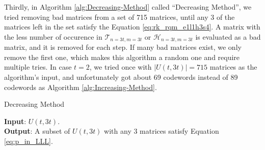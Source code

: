Thirdly, in Algorithm \ref{alg:Decreasing-Method} called ``Decreasing
Method'', we tried removing bad matrices from a set of 715 matrices,
until any 3 of the matrices left in the set satisfy the Equation \ref{eq:rk_rqm_e1l1h3s4}.
A matrix with the less number of occurence in $\mathcal{T}_{n=3t,m=3t}$
or $\mathcal{H}_{n=3t,m=3t}$ is evaluated as a bad matrix, and it
is removed for each step. If many bad matrices exist, we only remove
the first one, which makes this algorithm a random one and require
multiple tries. In case $t=2$, we tried once with $\left|U\left(t,3t\right)\right|=715$
matrices as the algorithm's input, and unfortunately got about 69
codewords instead of 89 codewords as Algorithm \ref{alg:Increasing-Method}. 

\begin{algorithm}[H]
\caption{Decreasing Method \label{alg:Decreasing-Method}}

\hspace*{\algorithmicindent} \textbf{Input}: $U(t,3t)$. \\
\hspace*{\algorithmicindent} \textbf{Output}: A subset of $U(t,3t)$ with any 3 matrices satisfy Equation \ref{eq:p_in_LLL}. 
\begin{algorithmic}[1]
	\REPEAT
		\ENDIF
	\ENDFOR
\end{algorithmic}
\end{algorithm}
